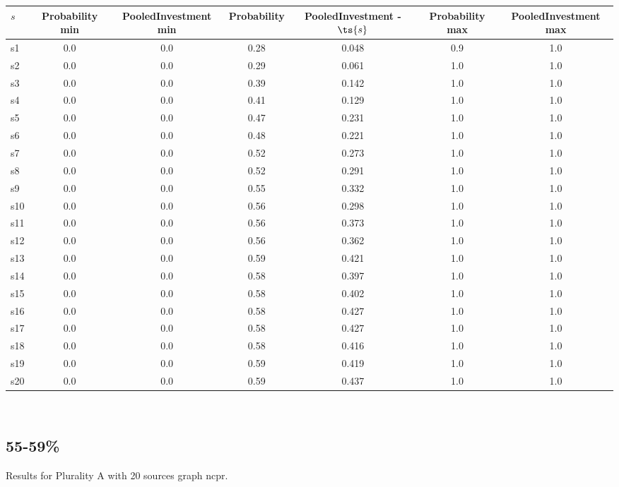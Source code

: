 \documentclass{article}
\begin{document}
\noindent\begin{tabular}{|l|c|c|c|c|c|c|}
\hline
$s$& Probability min & PooledInvestment min & Probability & PooledInvestment - $\ts{s}$ & Probability max & PooledInvestment max\\
\hline
s1 &0.0 & 0.0 & 0.28 & 0.048 & 0.9 & 1.0\\
\hline
s2 &0.0 & 0.0 & 0.29 & 0.061 & 1.0 & 1.0\\
\hline
s3 &0.0 & 0.0 & 0.39 & 0.142 & 1.0 & 1.0\\
\hline
s4 &0.0 & 0.0 & 0.41 & 0.129 & 1.0 & 1.0\\
\hline
s5 &0.0 & 0.0 & 0.47 & 0.231 & 1.0 & 1.0\\
\hline
s6 &0.0 & 0.0 & 0.48 & 0.221 & 1.0 & 1.0\\
\hline
s7 &0.0 & 0.0 & 0.52 & 0.273 & 1.0 & 1.0\\
\hline
s8 &0.0 & 0.0 & 0.52 & 0.291 & 1.0 & 1.0\\
\hline
s9 &0.0 & 0.0 & 0.55 & 0.332 & 1.0 & 1.0\\
\hline
s10 &0.0 & 0.0 & 0.56 & 0.298 & 1.0 & 1.0\\
\hline
s11 &0.0 & 0.0 & 0.56 & 0.373 & 1.0 & 1.0\\
\hline
s12 &0.0 & 0.0 & 0.56 & 0.362 & 1.0 & 1.0\\
\hline
s13 &0.0 & 0.0 & 0.59 & 0.421 & 1.0 & 1.0\\
\hline
s14 &0.0 & 0.0 & 0.58 & 0.397 & 1.0 & 1.0\\
\hline
s15 &0.0 & 0.0 & 0.58 & 0.402 & 1.0 & 1.0\\
\hline
s16 &0.0 & 0.0 & 0.58 & 0.427 & 1.0 & 1.0\\
\hline
s17 &0.0 & 0.0 & 0.58 & 0.427 & 1.0 & 1.0\\
\hline
s18 &0.0 & 0.0 & 0.58 & 0.416 & 1.0 & 1.0\\
\hline
s19 &0.0 & 0.0 & 0.59 & 0.419 & 1.0 & 1.0\\
\hline
s20 &0.0 & 0.0 & 0.59 & 0.437 & 1.0 & 1.0\\
\hline
\end{tabular}\\

\newpage

\subsection{55-59\%}

\noindent Results for Plurality A with 20 sources graph ncpr.
\end{document}
